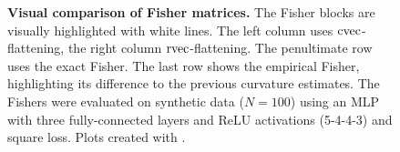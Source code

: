 \begin{figure}[!h]
\begin{minipage}[t]{0.49\linewidth}
  \end{minipage}
  \caption{\textbf{Visual comparison of Fisher matrices.}
    The Fisher blocks are visually highlighted with white lines.
    The left column uses $\operatorname{cvec}$-flattening, the right column $\operatorname{rvec}$-flattening.
    The penultimate row uses the exact Fisher.
    The last row shows the empirical Fisher, highlighting its difference to the previous curvature estimates.
    The Fishers were evaluated on synthetic data ($N=100$) using an MLP with three fully-connected layers and ReLU activations (5-4-4-3) and square loss.
    Plots created with .
  }\label{fig:visual-comparison-mc-empirical-fisher}
\end{figure}


